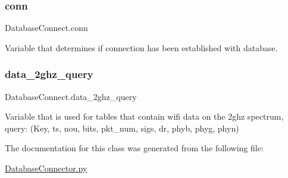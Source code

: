 \subsubsection{\texorpdfstring{conn}{conn}}
{\footnotesize\ttfamily Database\+Connect.\+conn}



Variable that determines if connection has been established with database. 

\mbox{\label{classDatabaseConnector_1_1DatabaseConnect_aa3b98ea56e1017172f5cee5e2369e667}} 
\subsubsection{\texorpdfstring{data\+\_\+2ghz\+\_\+query}{data\_2ghz\_query}}
{\footnotesize\ttfamily Database\+Connect.\+data\+\_\+2ghz\+\_\+query}



Variable that is used for tables that contain wifi data on the 2ghz spectrum, query\+: (Key, ts, nou, bits, pkt\+\_\+num, sigs, dr, phyb, phyg, phyn) 



The documentation for this class was generated from the following file\+:\begin{DoxyCompactItemize}
\item 
\mbox{\hyperlink{DatabaseConnector_8py}{Database\+Connector.\+py}}\end{DoxyCompactItemize}

